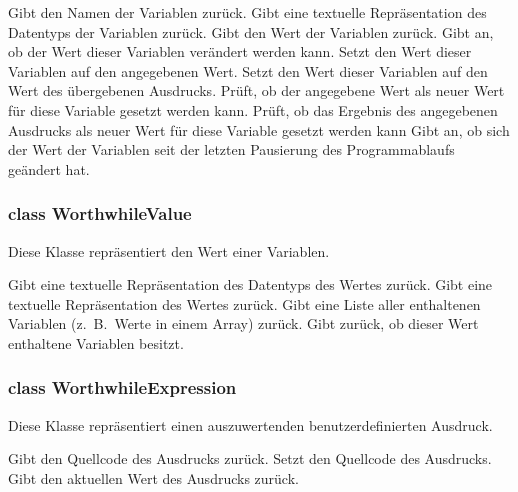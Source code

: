 \begin{description}
	 Gibt den Namen der Variablen zurück.
	 Gibt eine textuelle Repräsentation des Datentyps der Variablen zurück.
	 Gibt den Wert der Variablen zurück.
	 Gibt an, ob der Wert dieser Variablen verändert werden kann.
	 Setzt den Wert dieser Variablen auf den angegebenen Wert.
	 Setzt den Wert dieser Variablen auf den Wert des übergebenen Ausdrucks.
	 Prüft, ob der angegebene Wert als neuer Wert für diese Variable gesetzt werden kann.
	 Prüft, ob das Ergebnis des angegebenen Ausdrucks als neuer Wert für diese Variable gesetzt werden kann
	 Gibt an, ob sich der Wert der Variablen seit der letzten Pausierung des Programmablaufs geändert hat.
\end{description}

\subsubsection{class WorthwhileValue}

Diese Klasse repräsentiert den Wert einer Variablen.

\begin{description}
	 Gibt eine textuelle Repräsentation des Datentyps des Wertes zurück.
	 Gibt eine textuelle Repräsentation des Wertes zurück.
	 Gibt eine Liste aller enthaltenen Variablen (z.~B.\ Werte in einem Array) zurück.
	 Gibt zurück, ob dieser Wert enthaltene Variablen besitzt.
\end{description}

\subsubsection{class WorthwhileExpression}

Diese Klasse repräsentiert einen auszuwertenden benutzerdefinierten Ausdruck.

\begin{description}
	 Gibt den Quellcode des Ausdrucks zurück.
	 Setzt den Quellcode des Ausdrucks.
	 Gibt den aktuellen Wert des Ausdrucks zurück.
\end{description}

